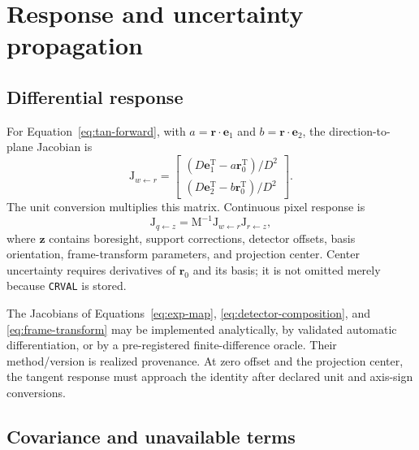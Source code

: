 \documentclass[11pt]{article}
\renewcommand{\mathsf}[1]{\mathrm{#1}}
\newcommand{\T}{\mathsf{T}}
\begin{document}
\section{Response and uncertainty propagation}

\subsection{Differential response}

For Equation~\eqref{eq:tan-forward}, with
$a=\boldsymbol r\cdot\boldsymbol e_1$ and
$b=\boldsymbol r\cdot\boldsymbol e_2$, the direction-to-plane Jacobian is
\begin{equation}
 \mathsf J_{w\leftarrow r}=
 \begin{bmatrix}
 (D\boldsymbol e_1^\T-a\boldsymbol r_0^\T)/D^2\\
 (D\boldsymbol e_2^\T-b\boldsymbol r_0^\T)/D^2
 \end{bmatrix}.
 \label{eq:projection-jacobian}
\end{equation}
The unit conversion multiplies this matrix.  Continuous pixel response is
\begin{equation}
 \mathsf J_{q\leftarrow z}=\mathsf M^{-1}
 \mathsf J_{w\leftarrow r}\mathsf J_{r\leftarrow z},
 \label{eq:pixel-jacobian}
\end{equation}
where $\boldsymbol z$ contains boresight, support corrections, detector
offsets, basis orientation, frame-transform parameters, and projection center.
Center uncertainty requires derivatives of $\boldsymbol r_0$ and its basis;
it is not omitted merely because \texttt{CRVAL} is stored.

The Jacobians of Equations~\eqref{eq:exp-map},
\eqref{eq:detector-composition}, and \eqref{eq:frame-transform} may be
implemented analytically, by validated automatic differentiation, or by a
pre-registered finite-difference oracle.  Their method/version is realized
provenance.  At zero offset and the projection center, the tangent response
must approach the identity after declared unit and axis-sign conversions.

\subsection{Covariance and unavailable terms}
\end{document}
